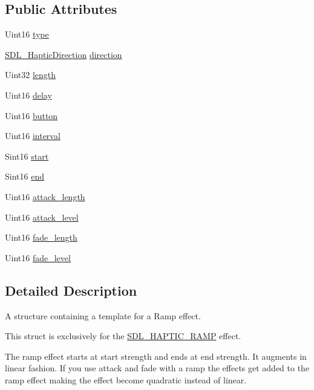 \subsection*{Public Attributes}
\begin{DoxyCompactItemize}
\item 
Uint16 \hyperlink{structSDL__HapticRamp_aca1c2349372433822ab62f60976640aa}{type}
\item 
\hyperlink{structSDL__HapticDirection}{S\+D\+L\+\_\+\+Haptic\+Direction} \hyperlink{structSDL__HapticRamp_a6fb6c67ccf262b8f3ec08bcdf08f9965}{direction}
\item 
Uint32 \hyperlink{structSDL__HapticRamp_a57e75237507701405af2a3caf34cdb5a}{length}
\item 
Uint16 \hyperlink{structSDL__HapticRamp_ac9471016f41919b4a1c786bbd649a777}{delay}
\item 
Uint16 \hyperlink{structSDL__HapticRamp_a2027c6fd88f1ebe652c90c71410ee0bf}{button}
\item 
Uint16 \hyperlink{structSDL__HapticRamp_a4b89d108cfa7e96ea58b58771334c33d}{interval}
\item 
Sint16 \hyperlink{structSDL__HapticRamp_acc0e813ac6399290fd4a788d2471e8d4}{start}
\item 
Sint16 \hyperlink{structSDL__HapticRamp_a16dd3ee307795248e21ee45ba8fb4c6c}{end}
\item 
Uint16 \hyperlink{structSDL__HapticRamp_adbcd7ffb05016d442c73e81cc0fcbbd2}{attack\+\_\+length}
\item 
Uint16 \hyperlink{structSDL__HapticRamp_a755933bbda14ae9b53c574b9fe6291a0}{attack\+\_\+level}
\item 
Uint16 \hyperlink{structSDL__HapticRamp_ad58a8f7cfdf659b45f0503fc56db7436}{fade\+\_\+length}
\item 
Uint16 \hyperlink{structSDL__HapticRamp_a66b586f2e6a23a085a7b2854f61752c5}{fade\+\_\+level}
\end{DoxyCompactItemize}


\subsection{Detailed Description}
A structure containing a template for a Ramp effect. 

This struct is exclusively for the \hyperlink{SDL__haptic_8h_af10eb937a64a8f602e9c46682ac0d868}{S\+D\+L\+\_\+\+H\+A\+P\+T\+I\+C\+\_\+\+R\+A\+MP} effect.

The ramp effect starts at start strength and ends at end strength. It augments in linear fashion. If you use attack and fade with a ramp the effects get added to the ramp effect making the effect become quadratic instead of linear.

